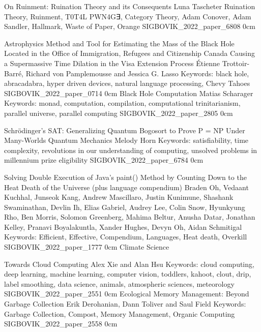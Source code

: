 \addpaper
    {On Ruinment: Ruination Theory and its Consequents}
    {Luna Tascheter}
    {Ruination Theory, Ruinment, T0T4L PWN4G∃, Category Theory, Adam Conover, Adam Sandler, Hallmark, Waste of Paper, Orange}
    {SIGBOVIK_2022_paper_6808}
    {0cm}
    {}

\addtrack
    {}{Astrophysics}
\addpaper
    {Method and Tool for Estimating the Mass of the Black Hole Located in the Office of Immigration, Refugees and Citizenship Canada Causing a Supermassive Time Dilation in the Visa Extension Process}
    {Étienne Trottoir-Barré, Richard von Pamplemousse and Jessica G. Lasso}
    {Keywords: black hole, abracadabra, hyper driven devices, natural language processing, Chevy Tahoes}
    {SIGBOVIK_2022_paper_0714}
    {0cm}
    {}
\addpaper
    {Black Hole Computation}
    {Matias Scharager}
    {Keywords: monad, computation, compilation, computational trinitarianism, parallel universe, parallel computing}
    {SIGBOVIK_2022_paper_2805}
    {0cm}
    {}

\addpaper
    {Schrödinger’s SAT: Generalizing Quantum Bogosort to Prove P = NP Under Many-Worlds Quantum Mechanics}
    {Melody Horn}
    {Keywords: satisfiability, time complexity, revolutions in our understanding of computing, unsolved problems in millennium prize eligibility}
    {SIGBOVIK_2022_paper_6784}
    {0cm}
    {}


\addpaper
    {Solving Double Execution of Java’s paint() Method by Counting Down to the Heat Death of the Universe (plus language compendium)}
    {Braden Oh, Vedaant Kuchhal, Junseok Kang, Andrew Mascillaro, Justin Kunimune, Shashank Swaminathan, Devlin Ih, Elias Gabriel, Audrey Lee, Colin Snow, Hyunkyung Rho, Ben Morris, Solomon Greenberg, Mahima Beltur, Anusha Datar, Jonathan Kelley, Pranavi Boyalakuntla, Xander Hughes, Devyn Oh, Aidan Schmitigal}
    {Keywords: Efficient, Effective, Compendium, Languages, Heat death, Overkill}
    {SIGBOVIK_2022_paper_1777}
    {0cm}
    {}
\addtrack
    {}{Climate Science}

\addpaper
    {Towards Cloud Computing}
    {Alex Xie and Alan Hsu}
    {Keywords: cloud computing, deep learning, machine learning, computer vision, toddlers, kahoot, clout, drip, label smoothing, data science, animals, atmospheric sciences, meteorology}
    {SIGBOVIK_2022_paper_2551}
    {0cm}
    {}
\addpaper
    {Ecological Memory Management: Beyond Garbage Collection}
    {Erik Derohanian, Dann Toliver and Saul Field}
    {Keywords: Garbage Collection, Compost, Memory Management, Organic Computing}
    {SIGBOVIK_2022_paper_2558}
    {0cm}
    {}

